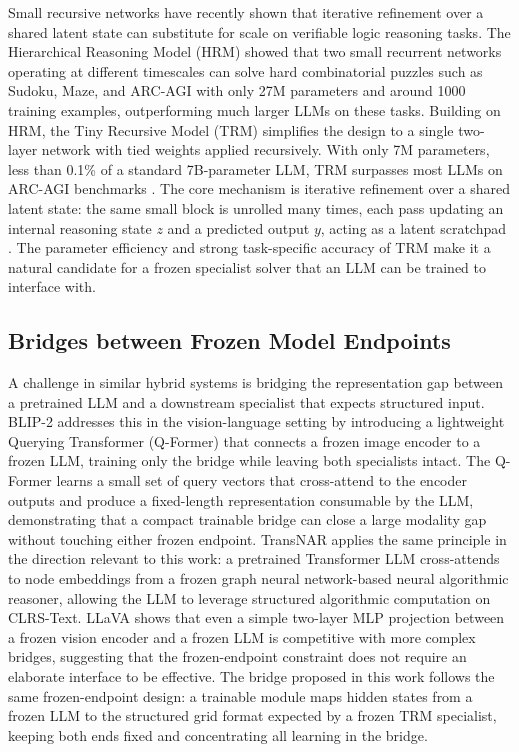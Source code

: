 \documentclass[11pt]{article}
\begin{document}
Small recursive networks have recently shown that iterative refinement over a shared latent state can substitute for scale on verifiable logic reasoning tasks.
The Hierarchical Reasoning Model (HRM) \cite{wangHierarchicalReasoningModel2025} showed that two small recurrent networks operating at different timescales can solve hard combinatorial puzzles such as Sudoku, Maze, and ARC-AGI with only 27M parameters and around 1000 training examples, outperforming much larger LLMs on these tasks.
Building on HRM, the Tiny Recursive Model (TRM) \cite{jolicoeur-martineauLessMoreRecursive2025} simplifies the design to a single two-layer network with tied weights applied recursively.
With only 7M parameters, less than 0.1\% of a standard 7B-parameter LLM, TRM surpasses most LLMs on ARC-AGI benchmarks \cite{cholletARCAGI2NewChallenge2026}.
The core mechanism is iterative refinement over a shared latent state: the same small block is unrolled many times, each pass updating an internal reasoning state $z$ and a predicted output $y$, acting as a latent scratchpad \cite{kohliLoopThinkGeneralize2026}.
The parameter efficiency and strong task-specific accuracy of TRM make it a natural candidate for a frozen specialist solver that an LLM can be trained to interface with.

\subsection{Bridges between Frozen Model Endpoints}
\label{sec:language_to_structure_interfaces}

A challenge in similar hybrid systems is bridging the representation gap between a pretrained LLM and a downstream specialist that expects structured input.
BLIP-2 \cite{liBLIP2BootstrappingLanguageImage2023} addresses this in the vision-language setting by introducing a lightweight Querying Transformer (Q-Former) that connects a frozen image encoder to a frozen LLM, training only the bridge while leaving both specialists intact.
The Q-Former learns a small set of query vectors that cross-attend to the encoder outputs and produce a fixed-length representation consumable by the LLM, demonstrating that a compact trainable bridge can close a large modality gap without touching either frozen endpoint.
TransNAR \cite{bounsiTransformersMeetNeural2024} applies the same principle in the direction relevant to this work: a pretrained Transformer LLM cross-attends to node embeddings from a frozen graph neural network-based neural algorithmic reasoner, allowing the LLM to leverage structured algorithmic computation on CLRS-Text.
LLaVA \cite{liuVisualInstructionTuning2023a} shows that even a simple two-layer MLP projection between a frozen vision encoder and a frozen LLM is competitive with more complex bridges, suggesting that the frozen-endpoint constraint does not require an elaborate interface to be effective.
The bridge proposed in this work follows the same frozen-endpoint design: a trainable module maps hidden states from a frozen LLM to the structured grid format expected by a frozen TRM specialist, keeping both ends fixed and concentrating all learning in the bridge.
\end{document}
